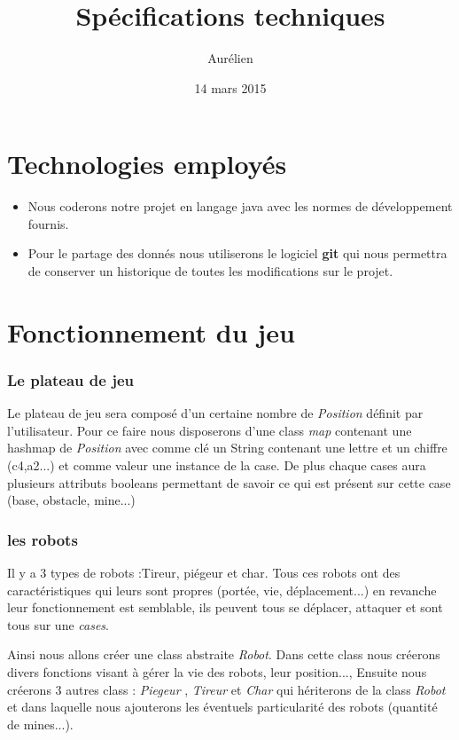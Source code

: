 \documentclass[12pt]{article}
\title{Spécifications techniques}
\author{Aurélien \bsc{Svevi}}
\date{14 mars 2015}
\begin{document}
\maketitle

\tableofcontents

\newpage
{}
\part*{Technologies employés}
\begin{itemize}
\item Nous coderons notre projet en langage java avec les normes de développement fournis.
\\
\item Pour le partage des donnés nous utiliserons le logiciel \textbf{git} qui nous permettra de conserver un historique de toutes les modifications sur le projet.


\end{itemize}

\newpage
{}
\part*{Fonctionnement du jeu}
\section{Le plateau de jeu}
Le plateau de jeu sera composé d'un certaine nombre de \emph{Position} définit par l'utilisateur.
Pour ce faire nous disposerons d'une class \emph{map} contenant une hashmap de \emph{Position} avec comme clé un String contenant une lettre et un chiffre (c4,a2...) et comme valeur une instance de la case.
De plus chaque cases aura plusieurs attributs booleans permettant de savoir ce qui est présent sur cette case (base, obstacle, mine...)

\section{les robots}
Il y a 3 types de robots :Tireur, piégeur et char.
Tous ces robots ont des caractéristiques qui leurs sont propres (portée, vie, déplacement...) en revanche leur fonctionnement est semblable, ils peuvent tous se déplacer, attaquer et sont tous sur une \emph{cases}.

Ainsi nous allons créer une class abstraite \emph{Robot}. Dans cette class nous créerons divers fonctions visant à gérer la vie des robots, leur position...,
Ensuite nous créerons 3 autres class : \emph{Piegeur} , \emph{Tireur} et \emph{Char} qui hériterons de la class \emph{Robot} et dans laquelle nous ajouterons les éventuels particularité des robots (quantité de mines...).
\end{document}
